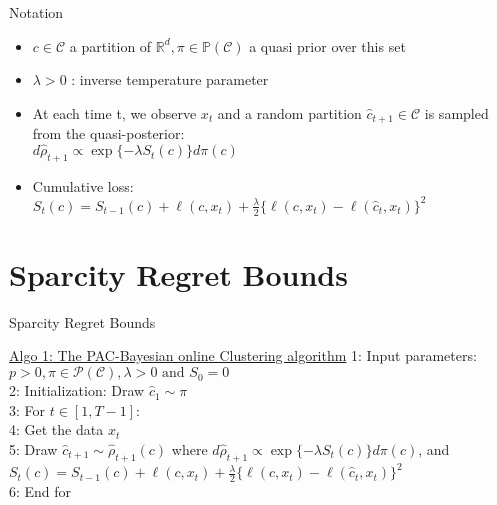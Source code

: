 \documentclass[10pt]{beamer}
\begin{document}
\begin{frame}[fragile]{Notation}
\begin{itemize}
\item $c \in \mathscr{C}$ a partition of $\mathbb{R}^{d}, \pi \in \mathbb{P}(\mathscr{C})$ a quasi prior over this set\\
\item $\lambda >0$ : inverse temperature parameter\\
\smallbreak
\item At each time t, we observe $x_{t}$ and a random partition $\hat{c}_{t+1} \in \mathscr{C}$ is sampled from the quasi-posterior:\\
$d\hat{\rho}_{t+1} \propto \exp{\{ -\lambda S_{t}(c) \}}
d\pi(c)$\\
\smallbreak
\item Cumulative loss:\\
$S_{t}(c) = S_{t-1}(c) + \ell (c, x_{t}) + \frac{\lambda}{2}
\{ \ell(c, x_{t}) - \ell (\hat{c}_{t},  x_{t}) \}^{2}$\\
\end{itemize}
\end{frame}

\section{Sparcity Regret Bounds}

\begin{frame}{Sparcity Regret Bounds}
\begin{block}{\underline{Algo 1: The PAC-Bayesian online Clustering algorithm}}
1: Input parameters: $p>0, \pi \in \mathscr{P}(\mathscr{C}), \lambda >0 \text{ and }S_{0}=0$\\
2: Initialization: Draw $\hat{c}_{1} \sim \pi$\\
3: For $t \in [1, T-1]:$\\
4: \quad Get the data $x_{t}$\\
5: \quad Draw $\hat{c}_{t+1} \sim \hat{\rho}_{t+1}(c)$ where $d\hat{\rho}_{t+1} \propto \exp{\{ -\lambda S_{t}(c) \}}
d\pi(c)$, and \\
\hspace*{2cm} $S_{t}(c) = S_{t-1}(c) + \ell (c, x_{t}) + \frac{\lambda}{2}
\{ \ell(c, x_{t}) - \ell (\hat{c}_{t},  x_{t}) \}^{2}$\\
6: End for
\end{block}
\end{frame}
\end{document}
